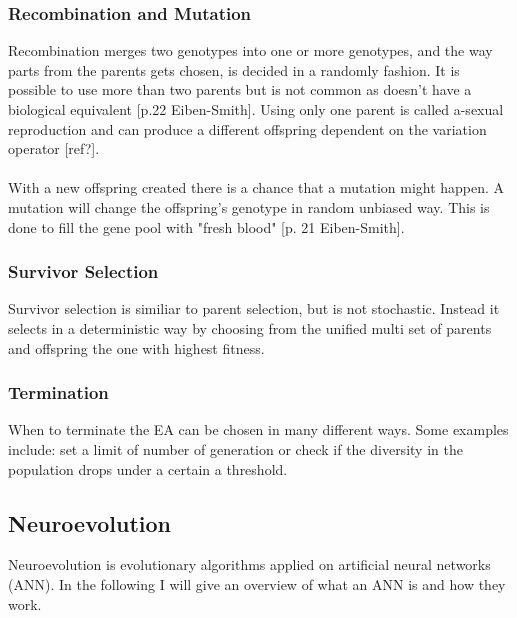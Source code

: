 \documentclass[11pt, a4paper]{article}
\begin{document}
\subsubsection{Recombination and Mutation}
Recombination merges two genotypes into one or more genotypes, and the way parts from the parents gets chosen, is decided in a randomly fashion. It is possible to use more than two parents but is not common as doesn't have a biological equivalent [p.22 Eiben-Smith]. Using only one parent is called a-sexual reproduction and can produce a different offspring dependent on the variation operator [ref?].
\\
\\
With a new offspring created there is a chance that a mutation might happen. A mutation will change the offspring's genotype in random unbiased way. This is done to fill the gene pool with "fresh blood" [p. 21 Eiben-Smith].
\subsubsection{Survivor Selection}
Survivor selection is similiar to parent selection, but is not stochastic. Instead it selects in a deterministic way by choosing from the unified multi set of parents and offspring the one with highest fitness.
\subsubsection{Termination}
When to terminate the EA can be chosen in many different ways. Some examples include: set a limit of number of generation or check if the diversity in the population drops under a certain a threshold.
\subsection{Neuroevolution}
Neuroevolution is evolutionary algorithms applied on artificial neural networks (ANN). In the following I will give an overview of what an ANN is and how they work.
\end{document}
